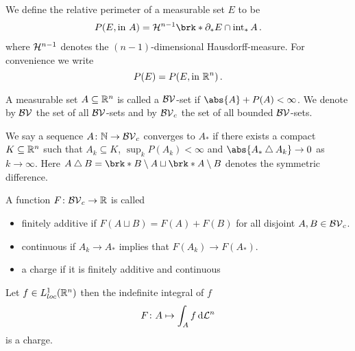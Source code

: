 \begin{frame}
	\begin{definition}
	We define the relative perimeter of a measurable set $E$ to be 
	\begin{align*}
		P(E,\text{in }A)=\cH^{n-1}\brk*{\partial_*E\cap \interiour_*A}\,.
	\end{align*}
	where $\mathcal{H}^{n-1}$ denotes the $(n-1)$-dimensional Hausdorff-measure. For convenience we write $$P(E)=P(E,\text{in }\mathbb{R}^n)\,.$$
	\end{definition}
\end{frame}

\begin{frame}
	\begin{definition}[$\BV$-sets]
	A measurable set $A\subseteq\mathbb{R}^n$ is called a $\BV$-set if $ \abs{A}+P(A)<\infty$. We denote by $\BV$ the set of all $\BV$-sets and by $\BV_c$ the set of all bounded $\BV$-sets.
	\end{definition}
	\begin{definition}[Topology on $\BV_c$]
	We say a sequence $A\colon\mathbb{N}\to \mathcal{BV}_c$ converges to $A_*$ if there exists a compact $K\subseteq\mathbb{R}^n$ such that $A_k\subseteq K$, $\sup_kP(A_k)<\infty$ and $\abs{A_*\symmDiff A_k}\to0$ as $k\to\infty$. Here $A\symmDiff B=\brk*{B\setminus A}\sqcup \brk*{A\setminus B}$ denotes the symmetric difference.
	\end{definition}
\end{frame}

\begin{frame}
	\begin{definition}[Charge]
	A function $F\colon \mathcal{BV}_c\to\mathbb{R}$ is called
	\begin{itemize}
		\item finitely additive if $F(A\sqcup B) =F(A)+F(B)$ for all disjoint $A,B\in\mathcal{BV}_c$.
		\item continuous if $A_k\to A_*$ implies that $F(A_k)\to F(A_*)$.
		\item a charge if it is finitely additive and continuous
	\end{itemize}
	\end{definition}
	\begin{Example}
	Let $f\in L^1_{loc}(\mathbb{R}^n)$ then the indefinite integral of $f$
	\begin{align*}
		F\colon A\mapsto \int_Af\,\mathrm{d} \mathcal{L}^n
	\end{align*}
	is a charge.
	\end{Example}
\end{frame}

